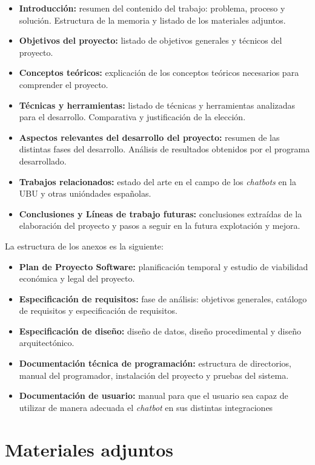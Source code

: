 \begin{itemize}
	\tightlist
	\item
	\textbf{Introducción:} resumen del contenido del trabajo: problema, proceso y solución. Estructura de la memoria y listado de los materiales adjuntos.
	\item
	\textbf{Objetivos del proyecto:} listado de objetivos generales y técnicos del proyecto.
	\item
	\textbf{Conceptos teóricos:} explicación de los conceptos teóricos necesarios para comprender el proyecto.
	\item
	\textbf{Técnicas y herramientas:} listado de técnicas y herramientas analizadas para el desarrollo. Comparativa y justificación de la elección.
	\item
	\textbf{Aspectos relevantes del desarrollo del proyecto:} resumen de las distintas fases del desarrollo. Análisis de resultados obtenidos por el programa desarrollado.
	\item
	\textbf{Trabajos relacionados:} estado del arte en el campo de los \textit{chatbots} en la UBU y otras unióndades españolas.
	\item
	\textbf{Conclusiones y Líneas de trabajo futuras:} conclusiones extraídas de la elaboración del proyecto y pasos a seguir en la futura explotación y mejora.
\end{itemize}


La estructura de los anexos es la siguiente:

\begin{itemize}
	\tightlist
	\item
	\textbf{Plan de Proyecto Software:} planificación temporal y estudio de viabilidad económica y legal del proyecto.
	\item
	\textbf{Especificación de requisitos:} fase de análisis: objetivos generales, catálogo de requisitos y especificación de requisitos.
	\item
	\textbf{Especificación de diseño:} diseño de datos, diseño procedimental y diseño arquitectónico.
	\item
	\textbf{Documentación técnica de programación:} estructura de directorios, manual del programador, instalación del proyecto y pruebas del sistema.
	\item
	\textbf{Documentación de usuario:} manual para que el usuario sea capaz de utilizar de manera adecuada el \textit{chatbot} en sus distintas integraciones
\end{itemize}


\section{Materiales adjuntos}

